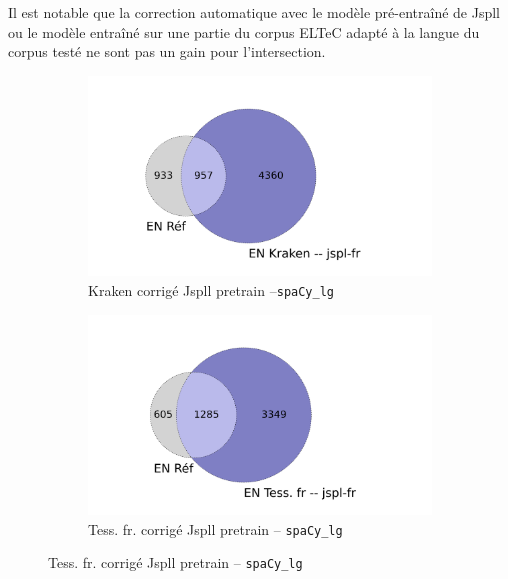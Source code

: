 Il est notable que la correction automatique avec le modèle pré-entraîné de Jspll ou le modèle entraîné sur une partie du corpus ELTeC adapté à la langue du corpus testé ne sont pas un gain pour l'intersection. 
\begin{figure}[h!]
    \begin{minipage}{7cm}
  \begin{subfigure}{1\textwidth}
  \includegraphics[width=1\textwidth]{IMAGES/INTERSECTIONS_GLOBALES/ELTeCFRA_Kraken -- jspl-fr_spacy-lg-concat_intersection.png} 
  \caption{Kraken corrigé Jspll pretrain --\texttt{spaCy\_lg}}
  \label{fig:ELTeCFRA_Kraken -- jspl-fr_spacy-lg-concat_intersection.png}
  \end{subfigure}
  \end{minipage}
  \begin{minipage}{7cm}
  \begin{subfigure}{1\textwidth}
  \includegraphics[width=1\textwidth]{IMAGES/INTERSECTIONS_GLOBALES/ELTeCFRA_Tess. fr -- jspl-fr_spacy-lg-concat_intersection.png} 
  \caption{Tess. fr. corrigé Jspll pretrain -- \texttt{spaCy\_lg}}

\end{subfigure}
\end{minipage}
\end{figure}
